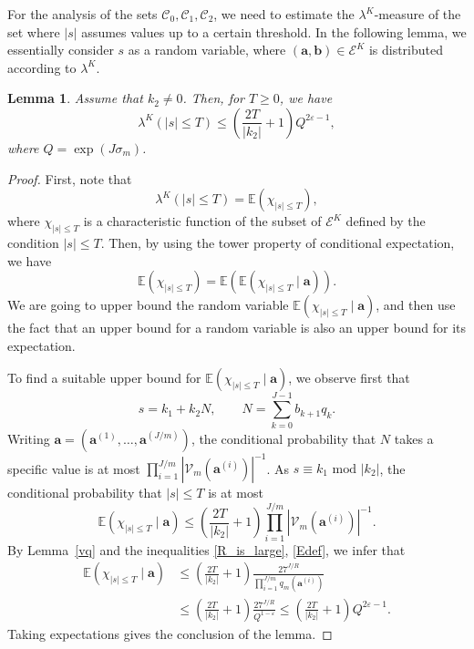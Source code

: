 \documentclass[12pt, reqno]{amsart}
\newtheorem{lemma}[thm]{Lemma}
\theoremstyle{definition}
\theoremstyle{remark}
\numberwithin{equation}{section}
\newcommand{\mmod}[1]{\,\,\mathrm{mod}\,\,#1}
\def\lam{{\lambda}} \def\Lam{{\Lambda}} \def\Lamtil{{\widetilde \Lambda}}
\def\eps{\varepsilon}
\def\le{\leqslant} \def\ge{\geqslant}
\def \bE {\mathbb E}
\def \ba {\mathbf a}
\def \bb {\mathbf b}
\def \cC {\mathcal C}
\def \cE {\mathcal E}
\def \cV {\mathcal V}
\begin{document}
For the analysis of the sets $\cC_0, \cC_1, \cC_2$, we need to estimate the 
$\lam^K$-measure of the set where $|s|$ assumes values up to a certain threshold. In the following lemma, we essentially consider $s$ as a random variable, where $(\ba,\bb) \in \cE^{K}$ is distributed according to  $ \lam^{K}$.  
\begin{lemma} \label{SmallProb} Assume that $k_2 \ne 0$. Then, for $T \ge 0$, we have
\[
\lam^K(|s| \le T) \le \left(\frac{2T}{|k_2|} + 1 \right) Q^{2 \eps - 1},
\]
where $Q=\exp\left(J\sigma_m\right)$.
\end{lemma}

\begin{proof} First, note that
\[
\lam^K\left(|s| \le T\right)=\bE\left(\chi_{|s| \le T}\right),
\]
where $\chi_{|s| \le T}$ is a characteristic function of the subset of $\cE^K$ defined by the condition $|s| \le T$. Then, by using the tower property of conditional expectation, we have
\[
\bE\left(\chi_{|s| \le T}\right)=\bE\left(\bE\left(\chi_{|s| \le T}\mid \ba\right)\right).
\]
We are going to upper bound the random variable $\bE\left(\chi_{|s| \le T}\mid \ba\right)$, and then use the fact that an upper bound for a random variable is also an upper bound for its expectation.

To find a suitable upper bound for $\bE\left(\chi_{|s| \le T}\mid \ba\right)$, we observe first that
\[
s = k_1 + k_2 N, \qquad N = \sum_{k=0}^{J-1} b_{k+1} q_k.
\]
Writing $\ba = (\ba^{(1)}, \ldots,\ba^{(J/m)})$, the conditional probability that $N$ takes a specific value is at most $\prod_{i=1}^{J/m} |\cV_m(\ba^{(i)})|^{-1}$.  As $s \equiv k_1 \mmod |k_2|$, the conditional probability that $|s| \le T$ is at most
\[
\bE\left(\chi_{|s| \le T}\mid \ba\right) \le \left( \frac{2T}{|k_2|} + 1 \right) \prod_{i=1}^{J/m} |\cV_m(\ba^{(i)})|^{-1}.
\]
By Lemma~\ref{vq} and the inequalities \eqref{R_is_large}, \eqref{Edef}, we infer that
\[
\begin{aligned}
\bE\left(\chi_{|s| \le T}\mid \ba\right) &\le \left(
\frac{2T}{|k_2|} + 1 \right)\frac{27^{J/R}} {\prod_{i=1}^{J/m}q_m(\ba^{(i)})} \\
&\le \left(
\frac{2T}{|k_2|} + 1 \right)\frac{27^{J/R}}{Q^{1-\varepsilon}}
\le \left(
\frac{2T}{|k_2|} + 1 \right)Q^{2\varepsilon-1}.
\end{aligned}
\]
Taking expectations gives the conclusion of the lemma.
\end{proof}
\end{document}
